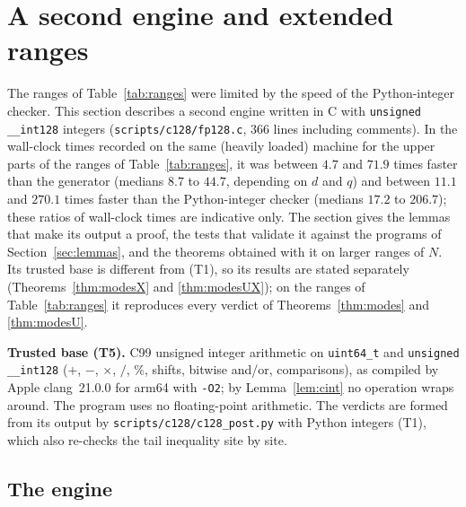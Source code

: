 \section{A second engine and extended ranges}\label{sec:ext}

The ranges of Table~\ref{tab:ranges} were limited by the speed of the Python-integer checker. This section describes a second engine written in C with \texttt{unsigned \_\_int128} integers (\texttt{scripts/c128/fp128.c}, 366 lines including comments). In the wall-clock times recorded on the same (heavily loaded) machine for the upper parts of the ranges of Table~\ref{tab:ranges}, it was between $4.7$ and $71.9$ times faster than the generator (medians $8.7$ to $44.7$, depending on $d$ and $q$) and between $11.1$ and $270.1$ times faster than the Python-integer checker (medians $17.2$ to $206.7$); these ratios of wall-clock times are indicative only.
The section gives the lemmas that make its output a proof, the tests that validate it against the programs of Section~\ref{sec:lemmas}, and the theorems obtained with it on larger ranges of $N$. Its trusted base is different from (T1), so its results are stated separately (Theorems~\ref{thm:modesX} and \ref{thm:modesUX}); on the ranges of Table~\ref{tab:ranges} it reproduces every verdict of Theorems~\ref{thm:modes} and \ref{thm:modesU}.

\textbf{Trusted base (T5).} C99 unsigned integer arithmetic on \texttt{uint64\_t} and \texttt{unsigned \_\_int128} ($+$, $-$, $\times$, $/$, $\%$, shifts, bitwise and/or, comparisons), as compiled by Apple clang~21.0.0 for arm64 with \texttt{-O2}; by Lemma~\ref{lem:cint} no operation wraps around. The program uses no floating-point arithmetic. The verdicts are formed from its output by \texttt{scripts/c128/c128\_post.py} with Python integers (T1), which also re-checks the tail inequality site by site.

\subsection{The engine}

